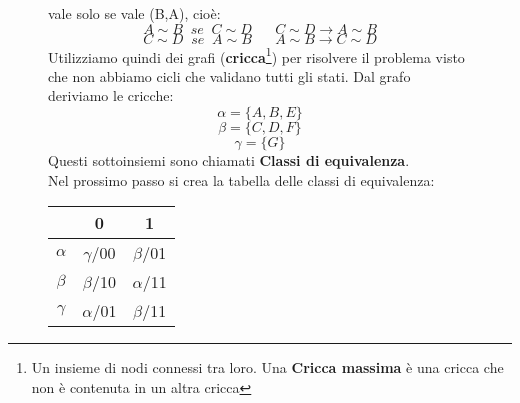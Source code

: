 \documentclass[a4paper]{article}
\theoremstyle{break}
\theoremstyle{break}
\theoremstyle{break}
\theoremstyle{break}
\begin{document}
\begin{figure}[H]
\begin{example}
    vale solo se vale (B,A), cioè:
    \[
    A \sim B\;\;se\;\; C \sim D\;\;\;\;\;\; C \sim D \to A \sim B
    \] 
    \[
    C \sim D\;\;se\;\; A \sim B\;\;\;\;\;\; A \sim B \to C \sim D
    \] 
    Utilizziamo quindi dei grafi (\textbf{cricca}\footnote{Un insieme di nodi connessi tra loro.
    Una \textbf{Cricca massima} è una cricca che non è contenuta in un altra cricca}) per risolvere il problema visto che non abbiamo cicli che
    validano tutti gli stati.
    \label{D1}
    Dal grafo deriviamo le cricche:
    \[
    \alpha = \{A,B,E\} 
    \] 
    \[
    \beta = \{C,D,F\}
    \] 
    \[
    \gamma = \{G\}
    \] 
    Questi sottoinsiemi sono chiamati \textbf{Classi di equivalenza}.\\
    Nel prossimo passo si crea la tabella delle classi di equivalenza:
    \begin{table}[H]
      \begin{center}
        \begin{tabular}{c|c|c}
          & 0 & 1 \\
          \hline
          \( \alpha \) & \( \gamma \)/00 & \( \beta \)/01  \\ 
          \( \beta \) & \( \beta \)/10 & \( \alpha \)/11 \\ 
          \( \gamma \) & \( \alpha \)/01 & \( \beta \)/11 \\ 
        \end{tabular}
      \end{center}
    \end{table}
  \end{example}
\end{figure}
\end{document}
